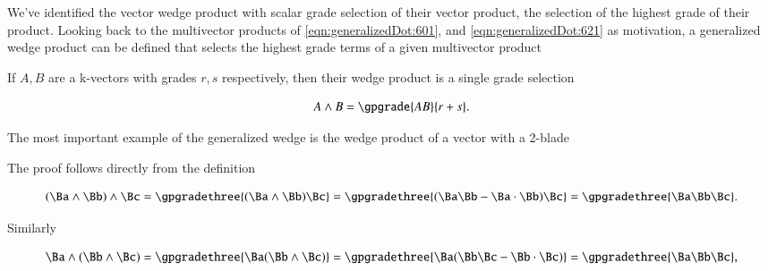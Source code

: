 %
%
We've identified the vector wedge product with scalar grade selection of their vector product, the selection of the highest grade of their product.
Looking back to the multivector products of \cref{eqn:generalizedDot:601}, and \cref{eqn:generalizedDot:621} as motivation,
a generalized wedge product can be defined that selects the highest grade terms of a given multivector product


If \( A, B \) are a k-vectors with grades \( r, s \) respectively, then their wedge product is a single grade selection

\begin{dmath}\label{eqn:generalizedWedge:560}
A \wedge B = \gpgrade{ A B }{ r + s}.
\end{dmath}

The most important example of the generalized wedge is the wedge product of a vector with a 2-blade


The proof follows directly from the definition

\begin{dmath}\label{eqn:generalizedWedge:580}
(\Ba \wedge \Bb) \wedge \Bc
=
\gpgradethree{ (\Ba \wedge \Bb) \Bc }
=
\gpgradethree{ (\Ba \Bb -\Ba \cdot \Bb) \Bc }
=
\gpgradethree{ \Ba \Bb \Bc }.
\end{dmath}

Similarly

\begin{dmath}\label{eqn:generalizedWedge:600}
\Ba \wedge (\Bb \wedge \Bc)
=
\gpgradethree{ \Ba (\Bb \wedge \Bc) }
=
\gpgradethree{ \Ba (\Bb \Bc - \Bb \cdot \Bc) }
=
\gpgradethree{ \Ba \Bb \Bc },
\end{dmath}

